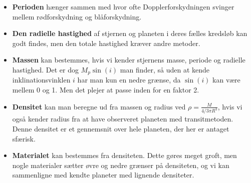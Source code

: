 \begin{itemize}
    \item \textbf{Perioden} hænger sammen med hvor ofte Dopplerforskydningen svinger mellem rødforskydning og blåforskydning. %
    \item \textbf{Den radielle hastighed} af stjernen og planeten i deres fælles kredsløb kan godt findes, men den totale hastighed kræver andre metoder.
    \item \textbf{Massen} kan bestemmes, hvis vi kender stjernens masse, periode og radielle hastighed.
    Det er dog $M_p \sin(i)$ man finder, så uden at kende inklinationsvinklen $i$ har man kun en nedre grænse, da $\sin(i)$ kan være mellem 0 og 1. Men det plejer at passe inden for en faktor 2.  
    \item \textbf{Densitet} kan man beregne ud fra massen og radius ved $\rho = \frac{M}{4/3 \pi R^3}$, hvis vi også kender radius fra at have observeret planeten med transitmetoden. Denne densitet er et gennemsnit over hele planeten, der her er antaget sfærisk.
    \item \textbf{Materialet} kan bestemmes fra densiteten. Dette gøres meget groft, men nogle materialer sætter øvre og nedre grænser på densiteten, og vi kan sammenligne med kendte planeter med lignende densiteter.
\end{itemize}


